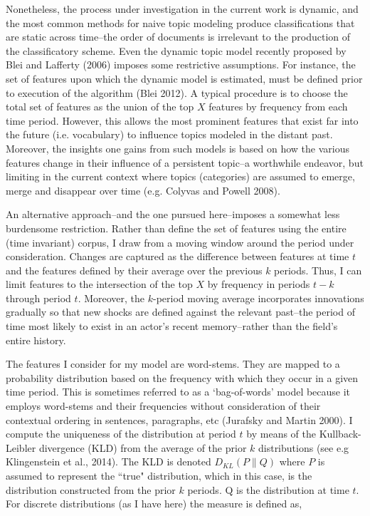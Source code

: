Nonetheless, the process under investigation in the current work is dynamic, and the most common methods for naive topic modeling produce classifications that are static across time--the order of documents is irrelevant to the production of the classificatory scheme. Even the dynamic topic model recently proposed by Blei and Lafferty (2006) imposes some restrictive assumptions. For instance, the set of features upon which the dynamic model is estimated, must be defined prior to execution of the algorithm (Blei 2012). A typical procedure is to choose the total set of features as the union of the top $X$ features by frequency from each time period. However, this allows the most prominent features that exist far into the future (i.e. vocabulary) to influence topics modeled in the distant past. Moreover, the insights one gains from such models is based on how the various features change in their influence of a persistent topic--a worthwhile endeavor, but limiting in the current context where topics (categories) are assumed to emerge, merge and disappear over time (e.g. Colyvas and Powell 2008).

An alternative approach--and the one pursued here--imposes a somewhat less burdensome restriction. Rather than define the set of features using the entire (time invariant) corpus, I draw from a moving window around the period under consideration. Changes are captured as the difference between features at time $t$ and the features defined by their average over the previous $k$ periods. Thus, I can limit features to the intersection of the top $X$ by frequency in periods $t-k$ through period $t$. Moreover, the $k$-period moving average incorporates innovations gradually so that new shocks are defined against the relevant past--the period of time most likely to exist in an actor's recent memory--rather than the field's entire history. 

The features I consider for my model are word-stems. They are mapped to a probability distribution based on the frequency with which they occur in a given time period. This is sometimes referred to as a `bag-of-words' model because it employs word-stems and their frequencies without consideration of their contextual ordering in sentences, paragraphs, etc (Jurafsky and Martin 2000). I compute the uniqueness of the distribution at period $t$ by means of the Kullback-Leibler divergence (KLD) from the average of the prior $k$ distributions (see e.g Klingenstein et al., 2014). The KLD is denoted $D_{KL}(P\|Q)$ where $P$ is assumed to represent the ``true" distribution, which in this case, is the distribution constructed from the prior $k$ periods. Q is the distribution at time $t$. For discrete distributions (as I have here) the measure is defined as,

